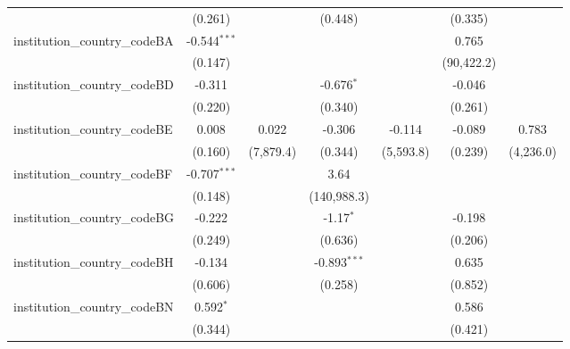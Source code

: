 \begin{tabular}{lcccccc}
                                         & (0.261)        &               & (0.448)        &               & (0.335)        &   \\   
   institution\_country\_codeBA          & -0.544$^{***}$ &               &                &               & 0.765          &   \\   
                                         & (0.147)        &               &                &               & (90,422.2)     &   \\   
   institution\_country\_codeBD          & -0.311         &               & -0.676$^{*}$   &               & -0.046         &   \\   
                                         & (0.220)        &               & (0.340)        &               & (0.261)        &   \\   
   institution\_country\_codeBE          & 0.008          & 0.022         & -0.306         & -0.114        & -0.089         & 0.783\\   
                                         & (0.160)        & (7,879.4)     & (0.344)        & (5,593.8)     & (0.239)        & (4,236.0)\\   
   institution\_country\_codeBF          & -0.707$^{***}$ &               & 3.64           &               &                &   \\   
                                         & (0.148)        &               & (140,988.3)    &               &                &   \\   
   institution\_country\_codeBG          & -0.222         &               & -1.17$^{*}$    &               & -0.198         &   \\   
                                         & (0.249)        &               & (0.636)        &               & (0.206)        &   \\   
   institution\_country\_codeBH          & -0.134         &               & -0.893$^{***}$ &               & 0.635          &   \\   
                                         & (0.606)        &               & (0.258)        &               & (0.852)        &   \\   
   institution\_country\_codeBN          & 0.592$^{*}$    &               &                &               & 0.586          &   \\   
                                         & (0.344)        &               &                &               & (0.421)        &   \\   

\end{tabular}
